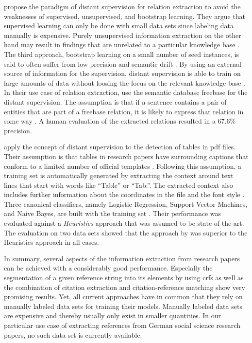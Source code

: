 \bigskip

\citet{mintz2009distant} propose the paradigm of \gls{distant supervision} for relation extraction to avoid the weaknesses of supervised, unsupervised, and bootstrap learning.
They argue that supervised learning can only be done with small data sets since labeling data manually is expensive.
Purely unsupervised information extraction on the other hand may result in findings that are unrelated to a particular knowledge base \citep{mintz2009distant}.
The third approach, bootstrap learning on a small number of seed instances, is said to often suffer from low precision and semantic drift \citep{mintz2009distant}.
By using an external source of information for the supervision, \gls{distant supervision} is able to train on large amounts of data without loosing the focus on the relevant knowledge base \citep{mintz2009distant}.
In their use case of relation extraction, \citet{mintz2009distant} use the semantic database \gls{freebase} \citep{bollacker2008freebase} for the \gls{distant supervision}.
The assumption is that if a sentence contains a pair of entities that are part of a \gls{freebase} relation, it is likely to express that relation in some way \citep{mintz2009distant}.
A human evaluation of the extracted relations resulted in a 67.6\% precision.

\citet{fan2015detecting} apply the concept of \gls{distant supervision} to the detection of tables in \gls{pdf} files.
Their assumption is that tables in research papers have surrounding captions that conform to a limited number of official templates \citep{fan2015detecting}.
Following this assumption, a training set is automatically generated by extracting the context around text lines that start with words like ``Table'' or ``Tab.''.
The extracted context also includes further information about the coordinates in the file and the font style \citep{fan2015detecting}.
Three canonical classifiers, namely Logistic Regression, Support Vector Machines, and Naive Bayes, are built with the training set \citep{fan2015detecting}.
Their performance was evaluated against a \emph{Heuristics} approach \citep{klampfl2014comparison} that was assumed to be state-of-the-art.
The evaluation on two data sets showed that the approach by \citet{fan2015detecting} was superior to the Heuristics approach in all cases.


\bigskip

In summary, several aspects of the information extraction from research papers can be achieved with a considerably good performance.
Especially the segmentation of a given reference string into its elements by using \glspl{crf} \citep{peng2004accurate,councill2008parscit,groza2012reference} as well as the combination of citation extraction and citation-reference matching \citep{powley2007evidence} show very promising results.
Yet, all current approaches have in common that they rely on manually labeled data sets for training their models.
Manually labeled data sets are expensive and thereby usually only exist in smaller quantities.
In our particular use case of extracting references from German social science research papers, no such data set is currently available.

